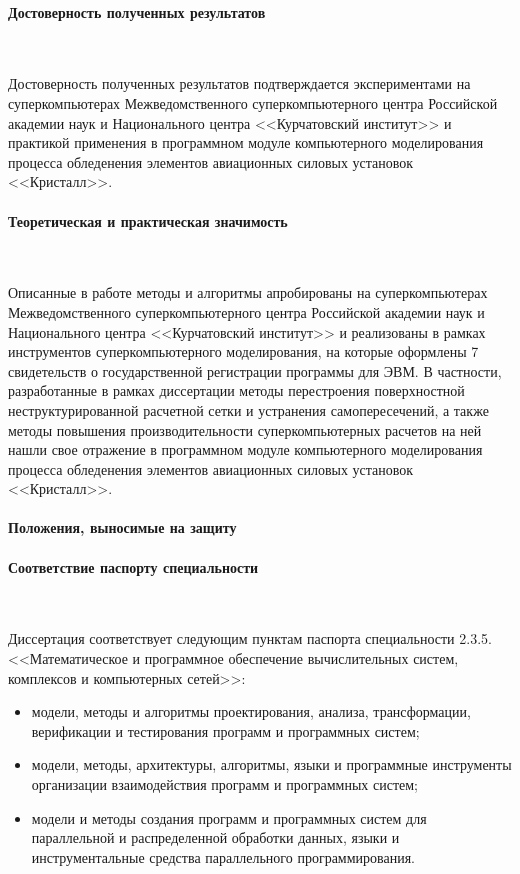 \documentclass[a4paper,14pt]{extarticle}                     %
\theoremstyle{plain}                                         %
\begin{document}
\paragraph{Достоверность полученных результатов} \

Достоверность полученных результатов подтверждается экспериментами на суперкомпьютерах Межведомственного суперкомпьютерного центра Российской академии наук и Национального центра <<Курчатовский институт>> и практикой применения в программном модуле компьютерного моделирования процесса обледенения элементов авиационных силовых установок <<Кристалл>>.

\paragraph{Теоретическая и практическая значимость} \



Описанные в работе методы и алгоритмы апробированы на суперкомпьютерах Межведомственного суперкомпьютерного центра Российской академии наук и Национального центра <<Курчатовский институт>> и реализованы в рамках инструментов суперкомпьютерного моделирования, на которые оформлены 7 свидетельств о государственной регистрации программы для ЭВМ.
В частности, разработанные в рамках диссертации методы перестроения поверхностной неструктурированной расчетной сетки и устранения самопересечений, а также методы повышения производительности суперкомпьютерных расчетов на ней нашли свое отражение в программном модуле компьютерного моделирования процесса обледенения элементов авиационных силовых установок <<Кристалл>>.

\paragraph{Положения, выносимые на защиту}
\begin{enumerate}[noitemsep,topsep=0pt,parsep=0pt,partopsep=0pt]

\end{enumerate}

\paragraph{Соответствие паспорту специальности} \

Диссертация соответствует следующим пунктам паспорта специальности 2.3.5. <<Математическое и программное обеспечение вычислительных систем, комплексов и компьютерных сетей>>:
\begin{itemize}[noitemsep,topsep=0pt,parsep=0pt,partopsep=0pt]
\item модели, методы и алгоритмы проектирования, анализа, трансформации, верификации и тестирования программ и программных систем;
\item модели, методы, архитектуры, алгоритмы, языки и программные инструменты организации взаимодействия программ и программных систем;
\item модели и методы создания программ и программных систем для параллельной и распределенной обработки данных, языки и инструментальные средства параллельного программирования.
\end{itemize}
\end{document}
